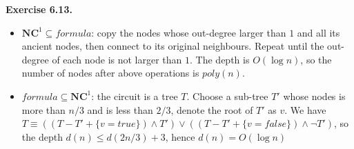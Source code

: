 \documentclass[a4paper]{article}
\newenvironment{exercise}[1]{
	\par
	\noindent\textbf{Exercise #1.}\quad
}{
	\par
	\bigskip
}
\begin{document}
\begin{exercise}{6.13}
\begin{itemize}
\item $\textbf{NC}^1 \subseteq formula$: copy the nodes  whose out-degree larger than $1$ and all its ancient nodes, then connect to its original neighbours. Repeat until the out-degree of each node is not larger than $1$. The depth is $O(\log n)$, so the number of nodes after above operations is $poly(n)$.
\item $ formula \subseteq\textbf{NC}^1$: the circuit is a tree $T$. Choose a sub-tree $T'$ whose nodes is more than $n/3$ and is less than $2/3$, denote the root of $T'$ as $v$.
We have $T\equiv((T-T'+\{v=true\})\wedge T')\vee((T-T'+\{v=false\})\wedge \neg T')$, so the depth $d(n)\le d(2n/3)+3$, hence $d(n)=O(\log n)$
\end{itemize}
\end{exercise}
\end{document}
